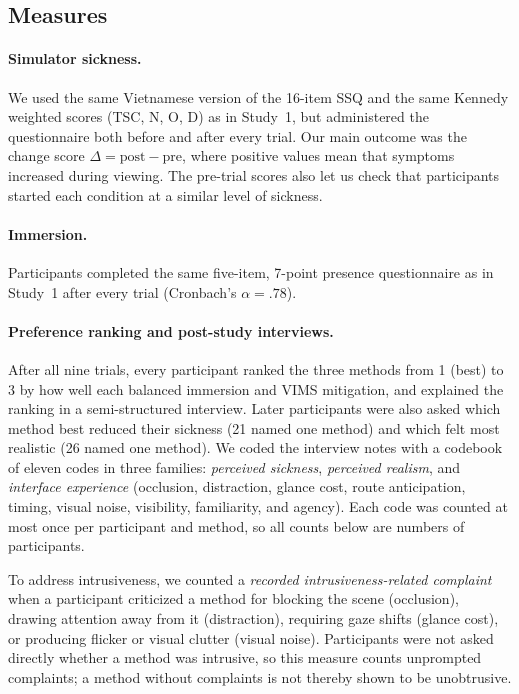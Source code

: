 \subsection{Measures}

\paragraph{Simulator sickness.}
We used the same Vietnamese version of the 16-item SSQ and the same Kennedy
weighted scores (TSC, N, O, D) as in Study~1, but administered the
questionnaire both before and after every trial. Our main outcome was the
change score $\Delta = \text{post} - \text{pre}$, where positive values mean
that symptoms increased during viewing. The pre-trial scores also let us check
that participants started each condition at a similar level of sickness.

\paragraph{Immersion.}
Participants completed the same five-item, 7-point presence questionnaire as in
Study~1 after every trial (Cronbach's $\alpha = .78$).

\paragraph{Preference ranking and post-study interviews.}
After all nine trials, every participant ranked the three methods from 1 (best)
to 3 by how well each balanced immersion and VIMS mitigation, and explained the
ranking in a semi-structured interview. Later participants were also asked
which method best reduced their sickness (21 named one method) and which felt
most realistic (26 named one method). We coded the interview notes with a
codebook of eleven codes in three families: \emph{perceived sickness},
\emph{perceived realism}, and \emph{interface experience} (occlusion,
distraction, glance cost, route anticipation, timing, visual noise, visibility,
familiarity, and agency). Each code was counted at most once per participant
and method, so all counts below are numbers of participants.

To address intrusiveness, we counted a \emph{recorded intrusiveness-related
complaint} when a participant criticized a method for blocking the scene
(occlusion), drawing attention away from it (distraction), requiring gaze
shifts (glance cost), or producing flicker or visual clutter (visual noise).
Participants were not asked directly whether a method was intrusive, so this
measure counts unprompted complaints; a method without complaints is not
thereby shown to be unobtrusive.

